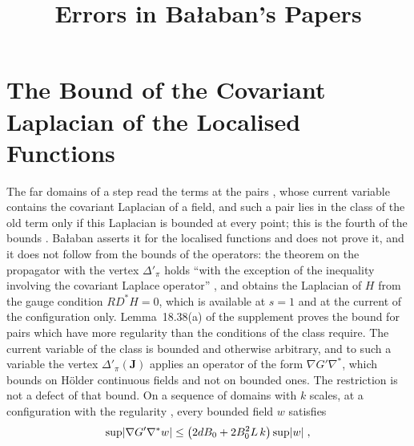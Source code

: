 \documentclass[11pt]{preprint}
\title{Errors in Ba{\l}aban's Papers}
\author{}
\date{}
\DeclarePairedDelimiter{\abs}{\lvert}{\rvert}
\numberwithin{equation}{section}
\begin{document}
\maketitle

\section{The Bound of the Covariant Laplacian of the Localised Functions}

The far domains of a step read the terms at the pairs \cite[(3.13)]{BalabanRG1}, whose current variable contains the covariant Laplacian of a field, and such a pair lies in the class of the old term only if this Laplacian is bounded at every point; this is the fourth of the bounds \cite[(3.14)]{BalabanRG1}. Ba{\l}aban asserts it for the localised functions \cite[p.~273]{BalabanRG1} and does not prove it, and it does not follow from the bounds of the operators: the theorem on the propagator with the vertex $\Delta'_\pi$ holds ``with the exception of the inequality involving the covariant Laplace operator'' \cite[p.~422]{BalabanPBG}, and \cite[(137)--(139), p.~298]{BalabanVAR} obtains the Laplacian of $H$ from the gauge condition $RD^*H = 0$, which is available at $s = 1$ and at the current of the configuration only. Lemma~18.38(a) of the supplement proves the bound for pairs which have more regularity than the conditions of the class require. The current variable of the class is bounded and otherwise arbitrary, and to such a variable the vertex $\Delta'_\pi(\mathbf J)$ applies an operator of the form $\nabla G'\nabla^*$, which \cite[(3.44)]{BalabanPBG} bounds on H\"older continuous fields and not on bounded ones. The restriction is not a defect of that bound. On a sequence of domains with $k$ scales, at a configuration with the regularity \cite[(3.35)]{BalabanPBG}, every bounded field $w$ satisfies
\begin{equation}\label{eq:log-norm}
    \sup\abs{\nabla G'\nabla^*w} \leq \bigl(2dB_0 + 2B_0^2L\,k\bigr)\sup\abs w\;,
\end{equation}
\end{document}
